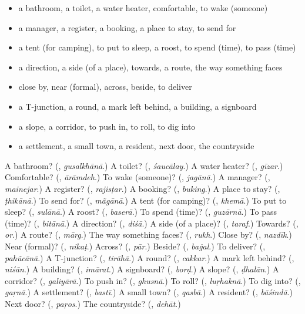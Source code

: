\begin{itemize}
\raggedright
  \item a bathroom, a toilet, a water heater, comfortable, to wake (someone)
  \item a manager, a register, a booking, a place to stay, to send for
  \item a tent (for camping), to put to sleep, a roost, to spend (time), to pass (time)
  \item a direction, a side (of a place), towards, a route, the way something faces
  \item close by, near (formal), across, beside, to deliver
  \item a T-junction, a round, a mark left behind, a building, a signboard
  \item a slope, a corridor, to push in, to roll, to dig into
  \item a settlement, a small town, a resident, next door, the countryside
\end{itemize}

\begin{tcolorbox}[breakable,colback=teal!4,colframe=teal!35!black,title={Before you move on}]
A bathroom? (\textbf{}, \emph{gusalkhānā}.) A toilet? (\textbf{}, \emph{śaucālay}.) A water heater? (\textbf{}, \emph{gīzar}.) Comfortable? (\textbf{}, \emph{ārāmdeh}.) To wake (someone)? (\textbf{}, \emph{jagānā}.) A manager? (\textbf{}, \emph{mainejar}.) A register? (\textbf{}, \emph{rajisṭar}.) A booking? (\textbf{}, \emph{buking}.) A place to stay? (\textbf{}, \emph{ṭhikānā}.) To send for? (\textbf{}, \emph{mãgānā}.) A tent (for camping)? (\textbf{}, \emph{khemā}.) To put to sleep? (\textbf{}, \emph{sulānā}.) A roost? (\textbf{}, \emph{baserā}.) To spend (time)? (\textbf{}, \emph{guzārnā}.) To pass (time)? (\textbf{}, \emph{bitānā}.) A direction? (\textbf{}, \emph{diśā}.) A side (of a place)? (\textbf{}, \emph{taraf}.) Towards? (\textbf{}, \emph{or}.) A route? (\textbf{}, \emph{mārg}.) The way something faces? (\textbf{}, \emph{rukh}.) Close by? (\textbf{}, \emph{nazdīk}.) Near (formal)? (\textbf{}, \emph{nikaṭ}.) Across? (\textbf{}, \emph{pār}.) Beside? (\textbf{}, \emph{baġal}.) To deliver? (\textbf{}, \emph{pahũcānā}.) A T-junction? (\textbf{}, \emph{tirāhā}.) A round? (\textbf{}, \emph{cakkar}.) A mark left behind? (\textbf{}, \emph{niśān}.) A building? (\textbf{}, \emph{imārat}.) A signboard? (\textbf{}, \emph{borḍ}.) A slope? (\textbf{}, \emph{ḍhalān}.) A corridor? (\textbf{}, \emph{galiyārā}.) To push in? (\textbf{}, \emph{ghusnā}.) To roll? (\textbf{}, \emph{luṛhaknā}.) To dig into? (\textbf{}, \emph{gaṛnā}.) A settlement? (\textbf{}, \emph{bastī}.) A small town? (\textbf{}, \emph{qasbā}.) A resident? (\textbf{}, \emph{bāśindā}.) Next door? (\textbf{}, \emph{paṛos}.) The countryside? (\textbf{}, \emph{dehāt}.)
\end{tcolorbox}
